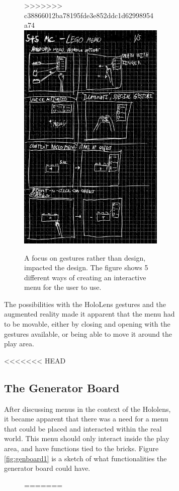 \begin{figure}[h]
\begin{figure}[h]
\begin{figure}[t]
>>>>>>> c38866012ba78195fde3e852ddc1d62998954a74
	\centering
	\includegraphics[width=0.7\linewidth]{figures/Menu/menu5}
	\caption{A focus on gestures rather than design, impacted the design. The figure shows 5 different ways of creating an interactive menu for the user to use.}
	\label{fig:menugesture}
\end{figure}
\par
The possibilities with the HoloLens gestures and the augmented reality made it apparent that the menu had to be movable, either by closing and opening with the gestures available, or being able to move it around the play area. 

<<<<<<< HEAD
\subsection{The Generator Board}
After discussing menus in the context of the Hololens, it became apparent that there was a need for a menu that could be placed and interacted within the real world. This menu should only interact inside the play area, and have functions tied to the bricks. Figure \ref{fig:genboard1} is a sketch of what functionalities the generator board could have.
\begin{figure}[h]
=======

\end{figure}
\end{figure}
\end{figure}
